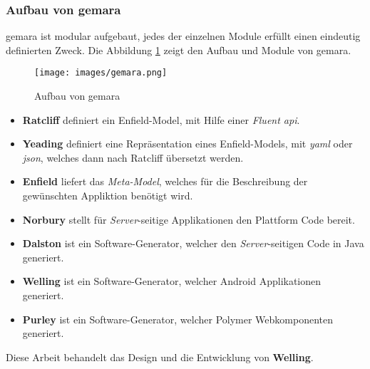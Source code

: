\newpage

\subsubsection{Aufbau von \acs{gemara}}

\acs{gemara} ist modular aufgebaut, jedes der einzelnen Module erfüllt einen eindeutig definierten Zweck. Die Abbildung \ref{fig:gemara} zeigt den Aufbau und Module von \acs{gemara}.

\begin{figure}[H]
	\begin{center}
		\texttt{[image: images/gemara.png]}
		\caption{Aufbau von \acs{gemara}}
		\label{fig:gemara}
	\end{center}
\end{figure}

\begin{itemize}
	\item \textbf{Ratcliff} definiert ein Enfield-Model, mit Hilfe einer \textit{Fluent \acs{api}}.
	\item \textbf{Yeading} definiert eine Repräsentation eines Enfield-Models, mit \textit{\acf{yaml}} oder \textit{\acf{json}}, welches dann nach Ratcliff übersetzt werden.
	\item \textbf{Enfield} liefert das \textit{Meta-Model}, welches für die Beschreibung der gewünschten Appliktion benötigt wird.
	\item \textbf{Norbury} stellt für \textit{Server}-seitige Applikationen den Plattform Code bereit.
	\item \textbf{Dalston} ist ein Software-Generator, welcher den \textit{Server}-seitigen Code in Java generiert.
	\item \textbf{Welling} ist ein Software-Generator, welcher Android Applikationen generiert.
	\item \textbf{Purley} ist ein Software-Generator, welcher Polymer Webkomponenten generiert. 
\end{itemize}


Diese Arbeit behandelt das Design und die Entwicklung von \textbf{Welling}.
